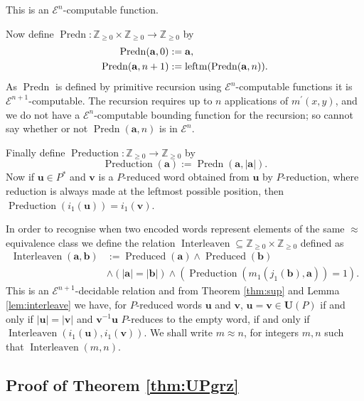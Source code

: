 \documentclass[a4paper]{article}
\newcommand{\grz}[1]{$\mathcal{E}^{#1}$}	%
\newcommand{\ZZ}{\mathbb{Z}}
\newcommand{\maps}{\longrightarrow}
\newcommand{\avec}{\mathbf{a}}	%
\newcommand{\bvec}{\mathbf{b}}	%
\newcommand{\uvec}{\mathbf{u}}	%
\newcommand{\vvec}{\mathbf{v}}	%
\newcommand{\Uvec}{\mathbf{U}}	%
\newcommand{\UP}{\Uvec(P)}
\newcommand{\Preduced}{\operatorname{Preduced}}
\newcommand{\leftm}{\operatorname{leftm}}
\newcommand{\Predn}{\operatorname{Predn}}
\newcommand{\Preduction}{\operatorname{Preduction}}
\newcommand{\Interleaven}{\operatorname{Interleaven}}
\theoremstyle{plain}
\theoremstyle{definition}
\begin{document}
This is an \grz{n}-computable function. 

Now define $\Predn:\ZZ_{\geq 0}\times \ZZ_{\geq 0} \maps \ZZ_{\geq 0}$ by
\begin{align}
\Predn(\avec,0) & := \avec,\notag\\
\Predn(\avec, n+1) & := \leftm(\Predn(\avec,n))\label{eq:Pr}.
\end{align} 
As $\Predn$ is defined by primitive recursion using \grz{n}-computable functions it
is \grz{n+1}-computable. 
The recursion requires up to $n$ applications of $m^\prime(x,y)$, and we 
do not have 
a \grz{n}-computable bounding function for the recursion; so cannot say
whether or not $\Predn(\avec,n)$ is in \grz{n}.

Finally define $\Preduction:\ZZ_{\geq 0}\maps \ZZ_{\geq 0}$ by
\begin{equation}\label{eq:Preduction}
\Preduction(\avec):=\Predn(\avec,|\avec|).
\end{equation}
Now if $\uvec \in P^\ast$ and $\vvec$ is a $P$-reduced word 
obtained from $\uvec$ by $P$-reduction, where reduction is always made 
at the leftmost possible position, then $\Preduction(i_1(\uvec))=i_1(\vvec)$. 

In order to recognise when two encoded words represent elements of the same
$\approx$ equivalence class we define the relation $\Interleaven\subseteq \ZZ_{\geq 0}\times \ZZ_{\geq 0}$ 
defined as 
\begin{equation}\label{eq:interleaven}
\begin{split}
\Interleaven(\avec,\bvec) & :=\Preduced(\avec)\wedge \Preduced(\bvec) \\ 
&\wedge (|\avec|=|\bvec|)
\wedge \left( \Preduction(m_1(j_1(\bvec),\avec))=1\right).
\end{split}
\end{equation}
This is an \grz{n+1}-decidable relation and from Theorem \ref{thm:sup} and Lemma \ref{lem:interleave} we have,
for $P$-reduced words $\uvec$ and $\vvec$, 
$\uvec=\vvec\in \UP$ if and only if  $|\uvec|=|\vvec|$ and $\vvec^{-1}\uvec$ $P$-reduces to the
empty word,  if and only if $\Interleaven(i_1(\uvec),i_1(\vvec))$.  
We shall write $m\approx n$, for integers $m,n$ such that $\Interleaven(m,n)$. 
\subsection{Proof of Theorem \ref{thm:UPgrz}}
\end{document}
